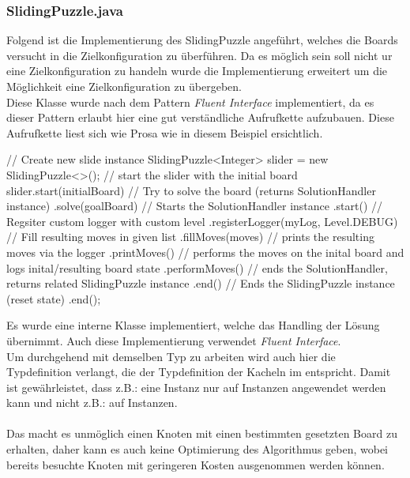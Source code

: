 \documentclass[11pt, a4paper, twoside]{article}   	%
\begin{document}
\subsubsection{SlidingPuzzle.java}
Folgend ist die Implementierung des SlidingPuzzle angeführt, welches die Boards versucht in die Zielkonfiguration zu überführen. Da es möglich sein soll nicht ur eine Zielkonfiguration zu handeln wurde die Implementierung erweitert um die Möglichkeit eine Zielkonfiguration zu übergeben.\\
Diese Klasse wurde nach dem Pattern \emph{Fluent Interface} implementiert, da es dieser Pattern erlaubt hier eine gut verständliche Aufrufkette aufzubauen. Diese Aufrufkette liest sich wie Prosa wie in diesem Beispiel ersichtlich. 
\begin{javaSource}
	// Create new slide instance
	SlidingPuzzle<Integer> slider = new SlidingPuzzle<>(); 
	// start the slider with the initial board
	slider.start(initialBoard)
		// Try to solve the board (returns SolutionHandler instance)
		.solve(goalBoard)      
		// Starts the SolutionHandler instance
		.start()      
		// Regsiter custom logger with custom level
		.registerLogger(myLog, Level.DEBUG)   
		// Fill resulting moves in given list      
		.fillMoves(moves)
		// prints the resulting moves via the logger
		.printMoves()
		// performs the moves on the inital board and logs inital/resulting board state
		.performMoves()
		// ends the SolutionHandler, returns related SlidingPuzzle instance
		.end()
		// Ends the SlidingPuzzle instance (reset state)
		.end();
\end{javaSource} 
Es wurde eine interne Klasse  implementiert, welche das Handling der Lösung übernimmt. Auch diese Implementierung verwendet \emph{Fluent Interface}. \\
Um durchgehend mit demselben Typ zu arbeiten wird auch hier die Typdefinition verlangt, die der Typdefinition der Kacheln im  entspricht. Damit ist gewährleistet, dass z.B.: eine  Instanz nur auf  Instanzen angewendet werden kann und nicht z.B.: auf  Instanzen.\\\\
Das macht es unmöglich einen Knoten mit einen bestimmten gesetzten Board zu erhalten, daher kann es auch keine Optimierung des Algorithmus geben, wobei bereits besuchte Knoten mit geringeren Kosten ausgenommen werden können.\\
\end{document}

